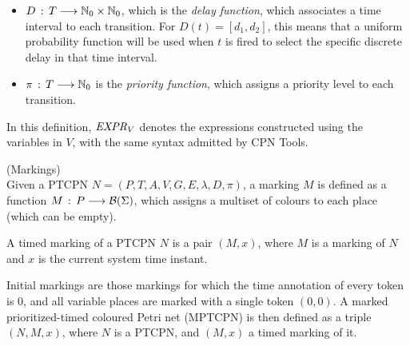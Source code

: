 \begin{definition}
\begin{itemize}
%
%
\item $D\,:\,T \longrightarrow \mathbb{N}_{0} \times \mathbb{N}_{0}$, which
is the {\em delay function}, which associates a time
interval to each transition. For $D(t)=[d_1,d_2]$,
this means that a uniform probability function will
be used when $t$ is fired to select the specific discrete
delay in that time interval.
%
\item $\pi\,:\,T \longrightarrow \mathbb{N}_{0}$ is the
{\em priority function}, which assigns a priority level
to each transition. 
\end{itemize}

In this definition, ${\it EXPR}_V$ denotes the
expressions constructed using the variables in $V$,
with the same syntax admitted by CPN Tools.
\end{definition}

\begin{definition} (Markings)\\
Given a PTCPN $N=(P,T,A,V,G,E,\lambda,D,\pi)$,
a marking $M$ is defined as a function
$M\,:\,P \longrightarrow {\cal B}(\Sigma)$,
which assigns a multiset of colours to each place
(which can be empty). 

A timed marking of a PTCPN $N$ is a pair $(M,x)$, where
$M$ is a marking of $N$ and $x$ is the current system time instant.
%
%

Initial markings are those markings for which
the time annotation of every token is $0$,
and all variable places are marked with a single
token $(0,0)$.
A marked prioritized-timed coloured Petri net (MPTCPN)
is then defined as a triple $(N,M,x)$, where
$N$ is a PTCPN, and $(M,x)$ a timed marking of it.
%
\end{definition}

